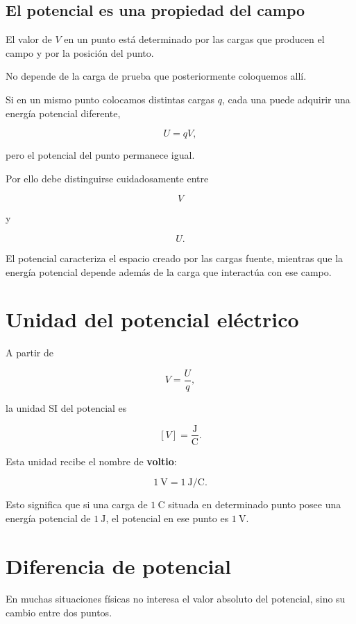 \subsection{El potencial es una propiedad del campo}

El valor de \(V\) en un punto está determinado por las cargas que producen el campo
y por la posición del punto.

No depende de la carga de prueba que posteriormente coloquemos allí.

Si en un mismo punto colocamos distintas cargas \(q\), cada una puede adquirir una
energía potencial diferente,

\[
U=qV,
\]

pero el potencial del punto permanece igual.

Por ello debe distinguirse cuidadosamente entre

\[
\boxed{V}
\]

y

\[
\boxed{U}.
\]

El potencial caracteriza el espacio creado por las cargas fuente, mientras que la
energía potencial depende además de la carga que interactúa con ese campo.


\section{Unidad del potencial eléctrico}

A partir de

\[
V=\frac{U}{q},
\]

la unidad SI del potencial es

\[
[V]=\frac{\si{\joule}}{\si{\coulomb}}.
\]

Esta unidad recibe el nombre de \textbf{voltio}:

\begin{equation}
\boxed{
\SI{1}{\volt}
=
\SI{1}{\joule\per\coulomb}
}.
\end{equation}

Esto significa que si una carga de \(\SI{1}{\coulomb}\) situada en determinado punto
posee una energía potencial de \(\SI{1}{\joule}\), el potencial en ese punto es
\(\SI{1}{\volt}\).


\section{Diferencia de potencial}

En muchas situaciones físicas no interesa el valor absoluto del potencial, sino su
cambio entre dos puntos.

